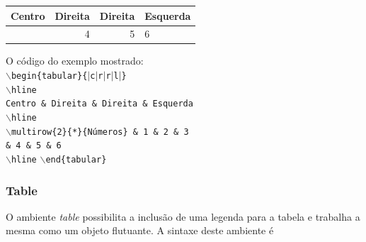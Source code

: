 \documentclass[12pt]{article}
\begin{document}
					\begin{center}
						\begin{tabular}{|c|r|r|l|}
							\hline
							Centro & Direita & Direita & Esquerda \\
							\hline
				
							& 4 & 5 & 6 \\
							\hline
						\end{tabular}
					\end{center}
					O código do exemplo mostrado:\\
					\texttt{$\backslash$begin\{{tabular}\}\{{$|$c$|$r$|$r$|$l$|$}\}\\}
					\texttt{$\backslash$hline \\}
					\texttt{Centro \& Direita \& Direita \& Esquerda \\}
					\texttt{$\backslash$hline\\}
					\texttt{$\backslash$multirow\{{2}\}\{{*}\}\{{Números}\} \& 1 \& 2 \& 3 \\}
					\texttt{\& 4 \& 5 \& 6 \\}
					\texttt{$\backslash$hline}
					\texttt{$\backslash$end\{{tabular}\}}
		
				\subsubsection{Table}	
		
					O ambiente \textit{table} possibilita a inclusão de uma legenda para a tabela e trabalha a mesma como um objeto flutuante. A sintaxe deste ambiente é
		
\end{document}
